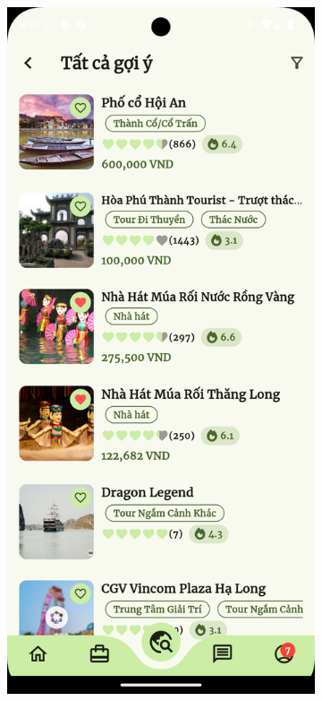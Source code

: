 \begin{figure}[H]
\begin{subfigure}{0.326\textwidth}
        \includegraphics[width=1\linewidth]{figures/c4/system_func/recommend.png}

\end{subfigure}
\end{figure}
